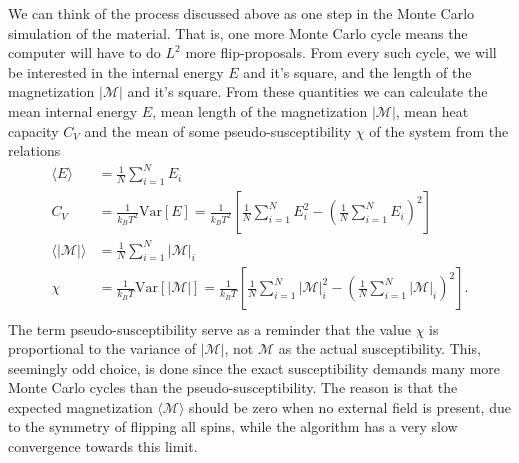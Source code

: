 \documentclass[twoside,utf8]{article}
\newcommand{\EQU}[1] { \begin{equation*} \begin{split} #1 \end{split} \end{equation*} }
\newcommand{\expe}[1]{ \langle #1 \rangle }
\begin{document}
We can think of the process discussed above as one step in the Monte Carlo simulation of the material. That is, one more Monte Carlo cycle means the computer will have to do $L^2$ more flip-proposals. From every such cycle, we will be interested in the internal energy $E$ and it's square, and the length of the magnetization $|\mathcal{M}|$ and it's square. From these quantities we can calculate the mean internal energy $E$, mean length of the magnetization $|\mathcal{M}|$, mean heat capacity $C_V$ and the mean of some pseudo-susceptibility $\chi$ of the system from the relations
\EQU{
\expe{E} &= \frac{1}{N}\sum_{i=1}^N E_i \\
C_V &= \frac{1}{k_BT^2}\mbox{Var}[E]
= \frac{1}{k_BT^2}\left[\frac{1}{N}\sum_{i=1}^N E_i^2-\left(\frac{1}{N}\sum_{i=1}^N E_i\right)^2\right]\\
\expe{|\mathcal{M}|} &= \frac{1}{N}\sum_{i=1}^N |\mathcal{M}|_i \\
\chi &= \frac{1}{k_BT}\mbox{Var}[|\mathcal{M}|]
= \frac{1}{k_BT}\left[\frac{1}{N}\sum_{i=1}^N |\mathcal{M}|_i^2 - \left(\frac{1}{N}\sum_{i=1}^N |\mathcal{M}|_i\right)^2 \right].  \\
}
The term pseudo-susceptibility serve as a reminder that the value $\chi$ is proportional to the variance of $|\mathcal{M}|$, not $\mathcal{M}$ as the actual susceptibility. This, seemingly odd choice, is done since the exact susceptibility demands many more Monte Carlo cycles than the pseudo-susceptibility. The reason is that the expected magnetization $\expe{\mathcal{M}}$ should be zero when no external field is present, due to the symmetry of flipping all spins, while the algorithm has a very slow convergence towards this limit.
\end{document}
